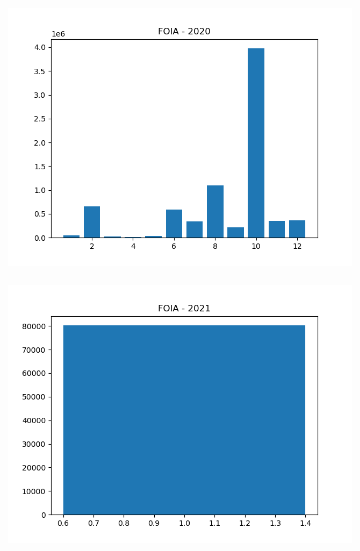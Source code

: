 \documentclass{article}
\begin{document}
\begin{figure}[H]
\begin{subfigure}{.5\textwidth}
    \end{subfigure}
    \begin{subfigure}{.5\textwidth}
        \centering
        \includegraphics[width=\textwidth]{../../output/figures/annual_source_distribution/FOIA_data_dist_2020.png}
    \end{subfigure}
    \begin{subfigure}{.5\textwidth}
        \centering
        \includegraphics[width=\textwidth]{../../output/figures/annual_source_distribution/FOIA_data_dist_2021.png}
    \end{subfigure}
    \begin{subfigure}{.5\textwidth}
        \centering

\end{subfigure}
\end{figure}
\end{document}
